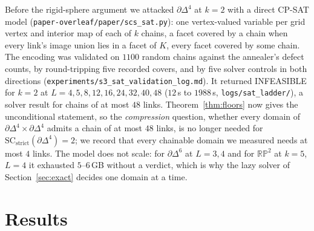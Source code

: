 \documentclass[12pt]{article}
\newcommand{\SC}{\mathrm{SC}}
\newcommand{\SCst}{\SC_{\mathrm{strict}}}
\begin{document}
Before the rigid-sphere argument we attacked $\partial\Delta^4$ at $k=2$
with a direct CP-SAT model (\texttt{paper-overleaf/paper/scs\_sat.py}): one
vertex-valued variable per grid vertex and interior map of each of $k$
chains, a facet covered by a chain when every link's image union lies in a
facet of $K$, every facet covered by some chain.  The encoding was validated
on $1100$ random chains against the annealer's defect counts, by
round-tripping five recorded covers, and by five solver controls in both
directions (\texttt{experiments/s3\_sat\_validation\_log.md}).  It returned
INFEASIBLE for $k=2$ at $L=4,5,8,12,16,24,32,40,48$ ($12$\,s to $1988$\,s,
\texttt{logs/sat\_ladder/}), a solver result for chains of at most $48$
links.  Theorem~\ref{thm:floors} now gives the unconditional statement, so
the \emph{compression} question, whether every domain of
$\partial\Delta^4\times\partial\Delta^4$ admits a chain of at most $48$
links, is no longer needed for $\SCst(\partial\Delta^4)=2$; we record that
every chainable domain we measured needs at most $4$ links.  The model does
not scale: for $\partial\Delta^6$ at $L=3,4$ and for $\mathbb{RP}^2$ at
$k=5$, $L=4$ it exhausted $5$--$6$\,GB without a verdict, which is why the
lazy solver of Section~\ref{sec:exact} decides one domain at a time.

\section{Results}\label{sec:results}
\end{document}
